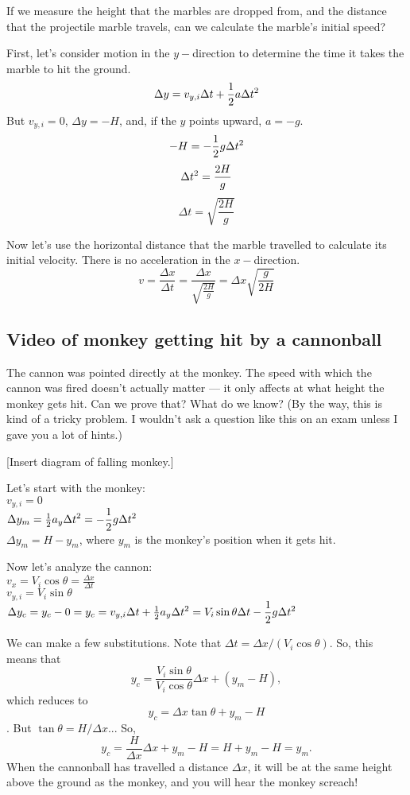 If we measure the height that the marbles are dropped from, and the distance that the projectile marble travels, can we calculate the marble's initial speed?

First, let's consider motion in the $y-$direction to determine the time it takes the marble to hit the ground.
$$\Delta{y}=v_{y,i}\Delta{t}+\frac{1}{2}a\Delta{t}\displaystyle^2$$
But $v_{y,i}=0$, $\Delta{y}=-H$, and, if the $y$ points upward, $a=-g$.
$$-H=-\frac{1}{2}g\Delta{t}\displaystyle^2$$
$$\Delta{t}\displaystyle^2=\frac{2H}{g}$$
$$\Delta{t}=\sqrt{\frac{2H}{g}}$$

Now let's use the horizontal distance that the marble travelled to calculate its initial velocity. There is no acceleration in the $x-$direction.
$$v=\frac{\Delta{x}}{\Delta{t}}=\frac{\Delta{x}}{\sqrt{\frac{2H}{g}}}=\Delta{x}\sqrt{\frac{g}{2H}}$$

\subsection*{Video of monkey getting hit by a cannonball}
The cannon was pointed directly at the monkey. The speed with which the cannon was fired doesn't actually matter --- it only affects at what height the monkey gets hit. Can we prove that? What do we know? (By the way, this is kind of a tricky problem. I wouldn't ask a question like this on an exam unless I gave you a lot of hints.)

[Insert diagram of falling monkey.]
\vspace{5cm}

Let's start with the monkey:\\
$v_{y,i}=0$\\
$\Delta{y_m}=\frac{1}{2}a_y\Delta{t}\displaystyle^2=-\frac{1}{2}g\Delta{t}\displaystyle^2$\\
$\Delta{y_m}=H-y_m$, where $y_m$ is the monkey's position when it gets hit.

Now let's analyze the cannon:\\
$v_{x}=V_i\cos\theta=\frac{\Delta{x}}{\Delta{t}}$\\
$v_{y,i}=V_i\sin\theta$\\
$\Delta{y_c}=y_c-0=y_c=v_{y,i}\Delta{t}+\frac{1}{2}a_y\Delta{t}\displaystyle^2=V_i\sin\theta\Delta{t}-\frac{1}{2}g\Delta{t}\displaystyle^2$

We can make a few substitutions. Note that $\Delta{t}=\Delta{x}/(V_i\cos\theta)$. So, this means that
$$y_c=\frac{V_i\sin\theta}{V_i\cos\theta}\Delta{x}+(y_m-H),$$
which reduces to
$$y_c=\Delta{x}\tan\theta+y_m-H$$.
But $\tan\theta=H/\Delta{x}$... So,
$$y_c=\frac{H}{\Delta{x}}\Delta{x}+y_m-H=H+y_m-H=y_m.$$
When the cannonball has travelled a distance $\Delta{x}$, it will be at the same height above the ground as the monkey, and you will hear the monkey screach!


